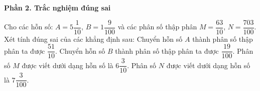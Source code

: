 \textbf{Phần 2. Trắc nghiệm đúng sai}

\begin{ex} %
Cho các hỗn số: $A = 5\dfrac{1}{10}$, $B = 1\dfrac{9}{100}$ và các phân số thập phân $M = \dfrac{63}{10}$, $N = \dfrac{703}{100}$. Xét tính đúng sai của các khẳng định sau:
\choiceTF
{\True Chuyển hỗn số $A$ thành phân số thập phân ta được $\dfrac{51}{10}$.}
{Chuyển hỗn số $B$ thành phân số thập phân ta được $\dfrac{19}{100}$.}
{\True Phân số $M$ được viết dưới dạng hỗn số là $6\dfrac{3}{10}$.}
{\True Phân số $N$ được viết dưới dạng hỗn số là $7\dfrac{3}{100}$.}
\end{ex}

